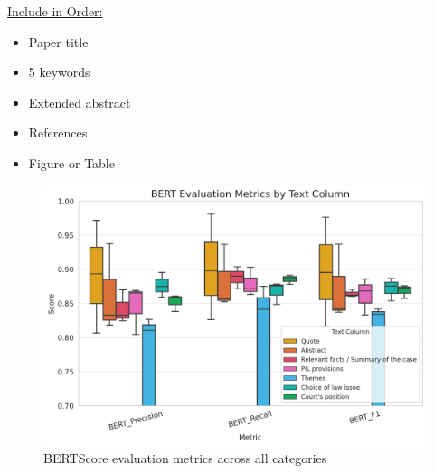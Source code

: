 \documentclass[a4paper,12pt]{article}
\begin{document}
\underline {Include in Order:}
\begin{itemize}
\itemsep0pt
  \item Paper title
  \item 5 keywords
  \item Extended abstract 
  \item References
  \item Figure or Table
\end{itemize}

\newpage

\begin{figure}[htp]
\centering
\includegraphics[width=14cm]{BERTScore-boxplots.png}
\caption{BERTScore evaluation metrics across all categories}
\label{fig:image}
\end{figure}
\end{document}
